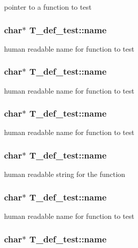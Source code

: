 pointer to a function to test 
\subsubsection{\setlength{\rightskip}{0pt plus 5cm}char$\ast$ T\_\-def\_\-test::name}\label{structT__def__test_m7}


human readable name for function to test 
\subsubsection{\setlength{\rightskip}{0pt plus 5cm}char$\ast$ T\_\-def\_\-test::name}\label{structT__def__test_m6}


human readable name for function to test 
\subsubsection{\setlength{\rightskip}{0pt plus 5cm}char$\ast$ T\_\-def\_\-test::name}\label{structT__def__test_m5}


human readable name for function to test 
\subsubsection{\setlength{\rightskip}{0pt plus 5cm}char$\ast$ T\_\-def\_\-test::name}\label{structT__def__test_m3}


human readable string for the function 
\subsubsection{\setlength{\rightskip}{0pt plus 5cm}char$\ast$ T\_\-def\_\-test::name}\label{structT__def__test_m2}


human readable name for function to test 
\subsubsection{\setlength{\rightskip}{0pt plus 5cm}char$\ast$ T\_\-def\_\-test::name}\label{structT__def__test_m1}


